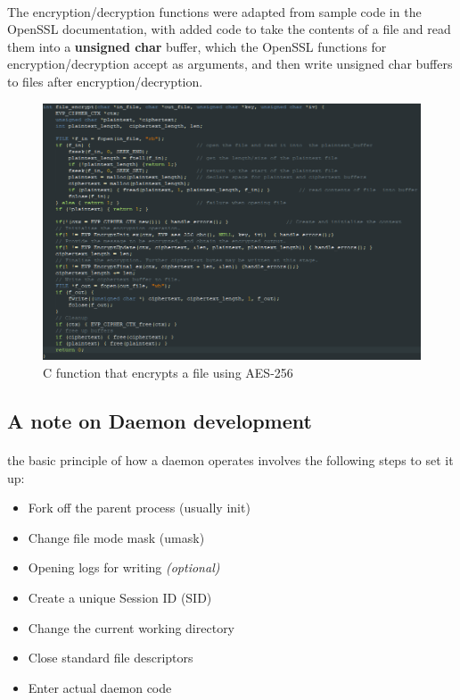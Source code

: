 \documentclass{article}
\begin{document}
        \paragraph{}The encryption/decryption functions were adapted from sample code in the OpenSSL documentation, with added code to take the contents of a file and read them into a \textbf{unsigned char} buffer, which the OpenSSL functions for encryption/decryption accept as arguments, and then write unsigned char buffers to files after encryption/decryption.

        \begin{figure}[htbp]
            \centering\includegraphics[width=\textwidth]{encrypt_function_screenshot_1.png}
            \caption{C function that encrypts a file using AES-256}
            \label{fig:my_label}
        \end{figure}
    \newpage
    \subsection{A note on Daemon development}
        \paragraph{}the basic principle of how a daemon operates involves the following steps to set it up:
        \begin{itemize}
            \item Fork off the parent process (usually init)
            \item Change file mode mask (umask)
            \item Opening logs for writing \textit{(optional)}
            \item Create a unique Session ID (SID)
            \item Change the current working directory
            \item Close standard file descriptors
            \item Enter actual daemon code
        \end{itemize}
\end{document}
